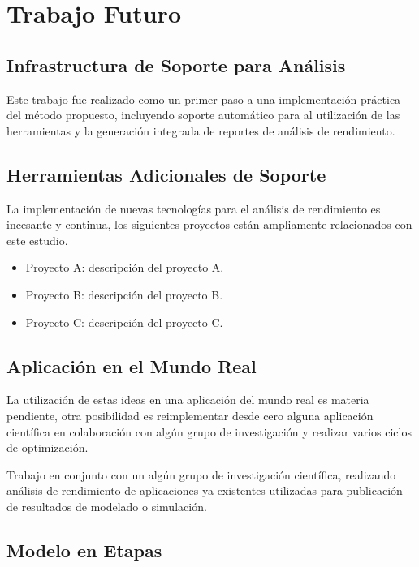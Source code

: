 \documentclass[a4paper]{report}
\begin{document}
\chapter{Trabajo Futuro}

\section{Infrastructura de Soporte para An\'alisis}

Este trabajo fue realizado como un primer paso a una implementaci\'on pr\'actica del m\'etodo propuesto,
incluyendo soporte autom\'atico para al utilizaci\'on de las herramientas y la generaci\'on integrada de
reportes de an\'alisis de rendimiento.

\section{Herramientas Adicionales de Soporte}

La implementaci\'on de nuevas tecnolog\'ias para el an\'alisis de rendimiento
es incesante y continua, los siguientes proyectos est\'an ampliamente
relacionados con este estudio.

\begin{itemize}
\item Proyecto A: descripci\'on del proyecto A.
\item Proyecto B: descripci\'on del proyecto B.
\item Proyecto C: descripci\'on del proyecto C.
\end{itemize}

\section{Aplicaci\'on en el Mundo Real}

La utilizaci\'on de estas ideas en una aplicaci\'on del mundo real es materia
pendiente, otra posibilidad es reimplementar desde cero alguna aplicaci\'on
cient\'ifica en colaboraci\'on con alg\'un grupo de investigaci\'on y realizar
varios ciclos de optimizaci\'on.

\bigskip

Trabajo en conjunto con un alg\'un grupo de investigaci\'on cient\'ifica,
realizando an\'alisis de rendimiento de aplicaciones ya existentes utilizadas
para publicaci\'on de resultados de modelado o simulaci\'on.

\section{Modelo en Etapas}
\end{document}
